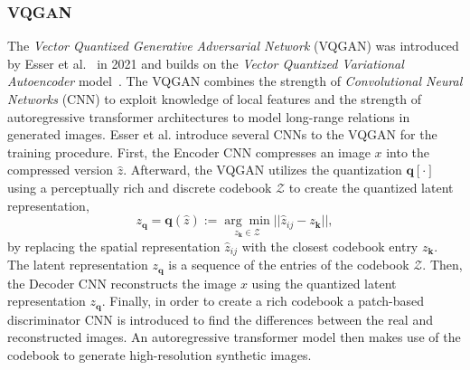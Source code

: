 \subsubsection{VQGAN}
\label{sec:wuerstchen:VQGAN}
The \emph{Vector Quantized Generative Adversarial Network} (VQGAN) was
introduced by Esser et al.~\cite{esser2021tamingtransformershighresolutionimage}
in 2021 and builds on the \emph{Vector Quantized Variational Autoencoder}
model~\cite{vdOord2017NeuralDiscreteRepresentationLearning}. The VQGAN combines
the strength of \emph{Convolutional Neural Networks} (CNN) to exploit knowledge
of local features and the strength of autoregressive transformer architectures
to model long-range relations in generated images. Esser et al. introduce
several CNNs to the VQGAN for the training procedure. First, the Encoder CNN
compresses an image $x$ into the compressed version $\hat{z}$. Afterward,
the VQGAN utilizes the quantization $\boldsymbol{q}[\cdot]$ using a
perceptually rich and discrete codebook $\mathcal{Z}$ to create the quantized
latent representation,
\begin{equation}
    z_{\boldsymbol{q}} = \boldsymbol{q}(\hat{z}) :=\underset{z_{\boldsymbol{k}}\in\mathcal{Z}}{\arg\min}||\hat{z}_{ij} - z_{\boldsymbol{k}}||,
\end{equation}
by replacing the spatial representation $\hat{z}_{ij}$ with the closest
codebook entry $z_{\boldsymbol{k}}$. The latent representation
$z_{\boldsymbol{q}}$ is a sequence of the entries of the codebook $\mathcal{Z}$.
Then, the Decoder CNN reconstructs the image $x$ using the quantized latent
representation $z_{\boldsymbol{q}}$. Finally, in order to create a rich codebook
a patch-based discriminator CNN is introduced to find the differences between
the real and reconstructed images. An autoregressive transformer model then
makes use of the codebook to generate high-resolution synthetic images.
